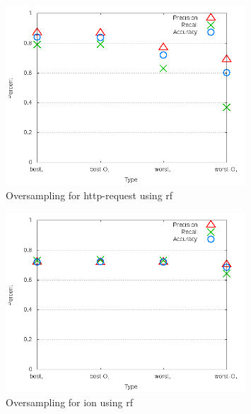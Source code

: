 \begin{figure}[!t]
\centering
\includegraphics[width=0.8\textwidth]{images/rf/test_4/http-request_sample_range.png}
\caption{Oversampling for http-request using \gls{rf}}
\label{fig:test_4_http-request_rf}
\end{figure}

\clearpage
\begin{figure}[!t]
\centering
\includegraphics[width=0.8\textwidth]{images/rf/test_4/ion_sample_range.png}
\caption{Oversampling for ion using \gls{rf}}
\label{fig:test_4_ion_rf}
\end{figure}

